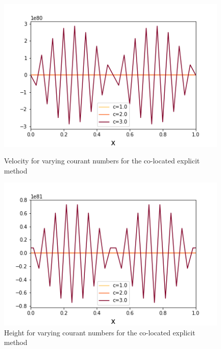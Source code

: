 \documentclass[a4paper,12pt, notitlepage]{article}
\begin{document}
\begin{figure} [H]
	\begin{minipage}{.5\textwidth}
		\ContinuedFloat*
		\captionsetup{width=0.9\textwidth}
		\captionsetup{justification=centering}
		\includegraphics[width=\textwidth]{velocity_varying_courant_explicit.png}
		\caption{\label{velocity_varying_courant_explicit} Velocity for varying courant numbers for the co-located explicit method} 
	\end{minipage}
	\begin{minipage}{.5\textwidth}
		\ContinuedFloat
		\captionsetup{width=0.9\textwidth}
		\captionsetup{justification=centering}
		\includegraphics[width=\textwidth]{height_varying_courant_explicit.png}
		\caption{\label{height_varying_courant_explicit} Height for varying courant numbers for the co-located explicit method} 
	\end{minipage}
\end{figure}
\end{document}
